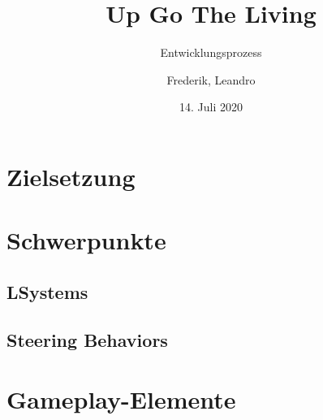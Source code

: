 \documentclass{beamer}
\title{Up Go The Living}
\subtitle{Entwicklungsprozess}
\author{Frederik, Leandro}
\institute{TU Dortmund}
\date{14. Juli 2020}
\begin{document}
\begin{frame}
\titlepage
\end{frame}

\section{Zielsetzung}


\section{Schwerpunkte}

\subsection{LSystems}


\subsection{Steering Behaviors}


\section{Gameplay-Elemente}
\end{document}
